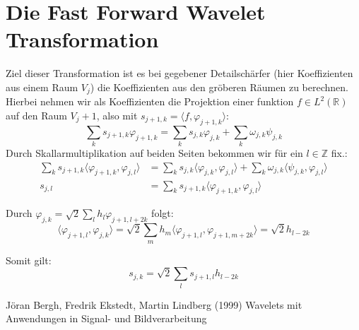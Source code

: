 \documentclass[]{scrartcl}
\theoremstyle{plain}
\theoremstyle{remark}
\newcommand{\lR}{L^2(\mathbb{R})}
\begin{document}
    \section{Die Fast Forward Wavelet Transformation}

    Ziel dieser Transformation ist es bei gegebener Detailschärfer (hier Koeffizienten aus einem Raum $V_j$) die Koeffizienten aus den gröberen Räumen zu berechnen.
    Hierbei nehmen wir als Koeffizienten die Projektion einer funktion $f \in \lR$ auf den Raum $V_j+1$, also mit $s_{j+1, k} = \langle f, \varphi_{j + 1, k}\rangle$:
    $$\sum_k s_{j+1, k} \varphi_{j+1, k} = \sum_k s_{j,k} \varphi_{j,k} + \sum_k \omega_{j, k} \psi_{j, k}$$
    Durch Skallarmultiplikation auf beiden Seiten bekommen wir für ein $l \in \mathbb{Z}$ fix.:
    \begin{align*}
        \sum_k s_{j+1, k} \langle \varphi_{j+1, k}, \varphi_{j, l} \rangle &= \sum_k s_{j,k} \langle \varphi_{j,k}, \varphi_{j, l} \rangle + \sum_k \omega_{j, k} \langle \psi_{j, k}, \varphi_{j, l} \rangle \\
        s_{j, l} &= \sum_k s_{j+1, k} \langle \varphi_{j+1, k}, \varphi_{j, l} \rangle 
    \end{align*}

    Durch $\varphi_{j,k} = \sqrt{2} \sum_l h_l \varphi_{j+1, l+2k}$ folgt:
    $$\langle \varphi_{j+1, l}, \varphi_{j, k} \rangle = \sqrt{2} \sum_m h_m \langle \varphi_{j+1, l}, \varphi_{j+1, m + 2k} \rangle = \sqrt{2} h_{l-2k}$$

    Somit gilt:
    $$s_{j, k} = \sqrt{2} \sum_l s_{j+1, l} h_{l - 2k}$$

    \begin{thebibliography}{99}
        Jöran Bergh, Fredrik Ekstedt, Martin Lindberg (1999) Wavelets mit Anwendungen in Signal- und Bildverarbeitung
    \end{thebibliography}
    
\end{document}
